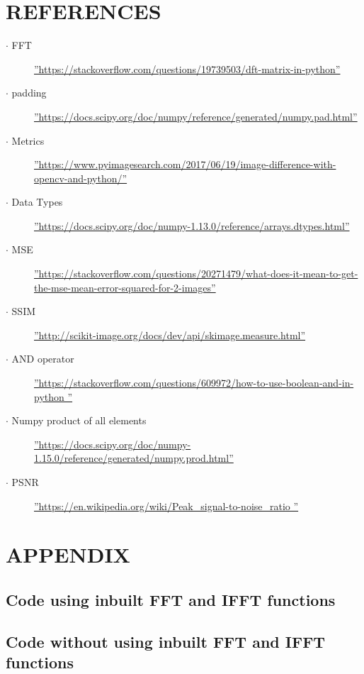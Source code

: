 \documentclass{article}
\begin{document}
\section{REFERENCES}
\begin{description}
    \item[$\cdot$ FFT] \hyperref[https://stackoverflow.com/questions/19739503/dft-matrix-in-python]{''https://stackoverflow.com/questions/19739503/dft-matrix-in-python''}
    \item[$\cdot$ padding] \hyperref[https://docs.scipy.org/doc/numpy/reference/generated/numpy.pad.html]{''https://docs.scipy.org/doc/numpy/reference/generated/numpy.pad.html''}
    \item[$\cdot$ Metrics] \hyperref[https://www.pyimagesearch.com/2017/06/19/image-difference-with-opencv-and-python/]{''https://www.pyimagesearch.com/2017/06/19/image-difference-with-opencv-and-python/''}
    \item[$\cdot$ Data Types] \hyperref[https://docs.scipy.org/doc/numpy-1.13.0/reference/arrays.dtypes.html]{''https://docs.scipy.org/doc/numpy-1.13.0/reference/arrays.dtypes.html''}
    \item[$\cdot$ MSE] \hyperref[https://stackoverflow.com/questions/20271479/what-does-it-mean-to-get-the-mse-mean-error-squared-for-2-images]{''https://stackoverflow.com/questions/20271479/what-does-it-mean-to-get-the-mse-mean-error-squared-for-2-images''}
    \item[$\cdot$ SSIM] \hyperref[http://scikit-image.org/docs/dev/api/skimage.measure.html]{''http://scikit-image.org/docs/dev/api/skimage.measure.html''}
    \item[$\cdot$ AND operator] \hyperref[https://stackoverflow.com/questions/609972/how-to-use-boolean-and-in-python ]{''https://stackoverflow.com/questions/609972/how-to-use-boolean-and-in-python ''}
    \item[$\cdot$ Numpy product of all elements] \hyperref[https://docs.scipy.org/doc/numpy-1.15.0/reference/generated/numpy.prod.html]{''https://docs.scipy.org/doc/numpy-1.15.0/reference/generated/numpy.prod.html''}
    \item[$\cdot$ PSNR] \hyperref[https://en.wikipedia.org/wiki/Peak_signal-to-noise_ratio ]{''https://en.wikipedia.org/wiki/Peak_signal-to-noise_ratio ''}

\end{description}
% 
\onecolumn
\section{APPENDIX}
\subsection{Code using inbuilt FFT and IFFT functions }

\subsection{Code  without using inbuilt FFT and IFFT functions }

\end{document}
